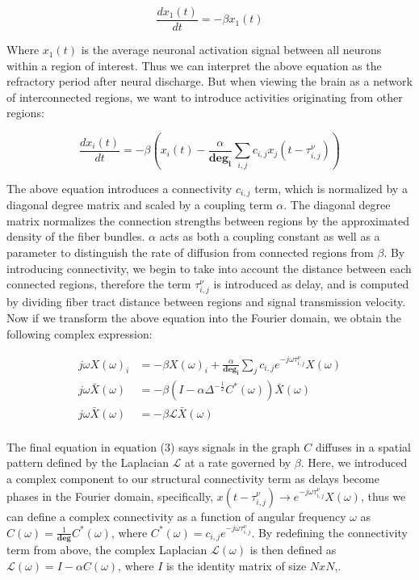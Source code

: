 \documentclass{article}
\begin{document}
\begin{equation}
    \label{dampedSys}
      \frac{dx_{1}(t)}{dt} = -\beta x_{1}(t)
\end{equation}

Where $x_{1}(t)$ is the average neuronal activation signal between all neurons within a region of interest. Thus we can interpret the above equation as the refractory period after neural discharge. But when viewing the brain as a network of interconnected regions, we want to introduce activities originating from other regions:

\begin{equation}
  \frac{dx_{i}(t)}{dt} = -\beta (x_{i}(t) - \frac{\alpha}{\pmb{deg_i}} \sum_{i,j} c_{i,j} x_{j}(t-\tau^{\nu}_{i,j}))
\end{equation}

The above equation introduces a connectivity $c_{i,j}$ term, which is normalized by a diagonal degree matrix and scaled by a coupling term $\alpha$. The diagonal degree matrix normalizes the connection strengths between regions by the approximated density of the fiber bundles. $\alpha$ acts as both a coupling constant as well as a parameter to distinguish the rate of diffusion from connected regions from $\beta$. By introducing connectivity, we begin to take into account the distance between each connected regions, therefore the term $\tau^{\nu}_{i,j}$ is introduced as delay, and is computed by dividing fiber tract distance between regions and signal transmission velocity. Now if we transform the above equation into the Fourier domain, we obtain the following complex expression:

\begin{equation} \label{eq:3}
    \begin{align*}
        j\omega X(\omega)_{i} &= -\beta X(\omega)_{i} + \frac{\alpha}{\pmb{deg_i}} \sum_j c_{i,j} e^{-j\omega \tau^{\nu}_{i,j}} X(\omega)\\
        j\omega \bar{X}(\omega) &= -\beta (I - \alpha \Delta^{-\frac{1}{2}} C^{*}(\omega)) \bar{X}(\omega)\\
        j\omega \bar{X}(\omega) &= -\beta \mathcal{L}\bar{X}(\omega)\\
    \end{align*}
\end{equation}

The final equation in equation (3) says signals in the graph $C$ diffuses in a spatial pattern defined by the Laplacian $\mathcal{L}$ at a rate governed by $\beta$. Here, we introduced a complex component to our structural connectivity term as delays become phases in the Fourier domain, specifically, $x(t-\tau^{\nu}_{i,j}) \to e^{-j\omega \tau^{\nu}_{i,j}} X(\omega)$, thus we can define a complex connectivity as a function of angular frequency $\omega$ as $C(\omega) = \frac{1}{\pmb{deg}}C^{*}(\omega)$, where $C^{*}(\omega) = c_{i,j}e^{-j\omega \tau^{\nu}_{i,j}}$. By redefining the connectivity term from above, the complex Laplacian $\mathcal{L}(\omega)$ is then defined as $\mathcal{L}(\omega) = I - \alpha C(\omega)$, where $I$ is the identity matrix of size $N x N$,.
\end{document}
